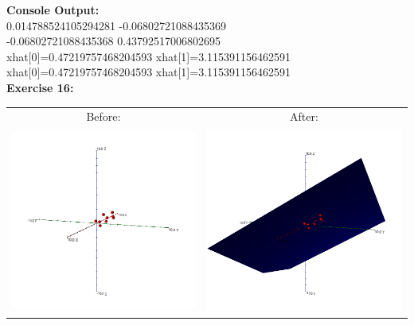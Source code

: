 \documentclass[10pt]{article}
\begin{document}
	\textbf{Console Output:} \\
	0.014788524105294281 -0.06802721088435369\\
	-0.06802721088435368 0.43792517006802695\\
	xhat[0]=0.47219757468204593 xhat[1]=3.115391156462591\\
	xhat[0]=0.47219757468204593 xhat[1]=3.115391156462591
	\\
	
	\textbf{\large Exercise 16:}\\
	\begin{tabular}{cc}
		Before: & After:\\ 
		\includegraphics[scale=.3]{module7_exercise16_a} & \includegraphics[scale=.3]{module7_exercise16_b}
	\end{tabular}
	
\end{document}
